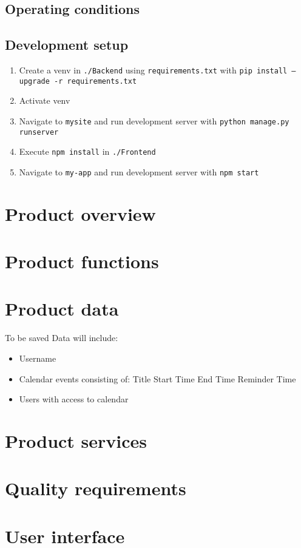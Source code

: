 \documentclass[]{article}
\begin{document}
	\subsection{Operating conditions}
	\subsection{Development setup}
		\begin{enumerate}
			\item Create a venv in \texttt{./Backend} using \texttt{requirements.txt} with \texttt{pip install --upgrade -r requirements.txt}
			\item Activate venv
			\item Navigate to \texttt{mysite} and run development server with \texttt{python manage.py runserver}
			\item Execute \texttt{npm install} in \texttt{./Frontend}
			\item Navigate to \texttt{my-app} and run development server with \texttt{npm start}
		\end{enumerate}
\section{Product overview}
\section{Product functions}
\section{Product data}
	To be saved Data will include:
	\begin{itemize}
		\item Username
		\item Calendar events consisting of:
			\subitem Title
			\subitem Start Time
			\subitem End Time
			\subitem Reminder Time
		\item Users with access to calendar
	\end{itemize}
\section{Product services}
\section{Quality requirements}
\section{User interface}
\end{document}
